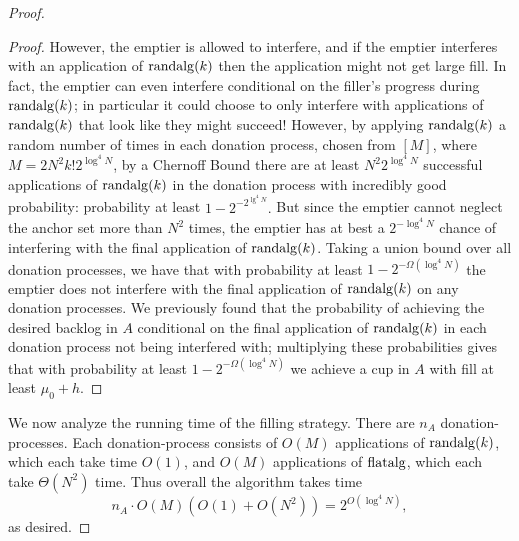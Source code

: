 \begin{proof}
\begin{proof}
  However, the emptier is allowed to interfere, and if the
  emptier interferes with an application of $\operatorname{\text{\textup{randalg}}}(k)$ then
  the application might not get large fill. In fact, the emptier
  can even interfere conditional on the filler's progress during
  $\operatorname{\text{\textup{randalg}}}(k)$; in particular it could choose to only interfere
  with applications of $\operatorname{\text{\textup{randalg}}}(k)$ that look like they might
  succeed! However, by applying $\operatorname{\text{\textup{randalg}}}(k)$ a random
  number of times in each donation process, chosen from $[M]$,
  where $M = 2N^2 k! 2^{\log^4 N}$, by a Chernoff Bound there are
  at least $N^2 2^{\log^4 N}$ successful applications of
  $\operatorname{\text{\textup{randalg}}}(k)$ in the donation process with incredibly good
  probability: probability at least $1-2^{-2^{\lg^4 N}}.$
  But since the emptier cannot neglect the anchor set more than
  $N^2$ times, the emptier has at best a $2^{-\log^4 N}$ chance
  of interfering with the final application of $\operatorname{\text{\textup{randalg}}}(k)$. 
  Taking a union bound over all donation processes, we have that
  with probability at least $1-2^{-\Omega(\log^4 N)}$ the emptier
  does not interfere with the final application of $\operatorname{\text{\textup{randalg}}}(k)$
  on any donation processes. We previously found that the
  probability of achieving the desired backlog in $A$ conditional
  on the final application of $\operatorname{\text{\textup{randalg}}}(k)$ in each donation
  process not being interfered with; multiplying these
  probabilities gives that with probability at least
  $1-2^{-\Omega(\log^4 N)}$ we achieve a cup in $A$ with fill
  at least $\mu_0 + h$.

\end{proof}

We now analyze the running time of the filling strategy. There
are $n_A$ donation-processes. Each donation-process consists of
$O(M)$ applications of $\operatorname{\text{\textup{randalg}}}(k)$, which each take time
$O(1)$, and $O(M)$ applications of $\operatorname{\text{\textup{flatalg}}}$, which each take
$\Theta(N^2)$ time. Thus overall the algorithm takes time $$n_A
\cdot O(M) (O(1) + O(N^2)) = 2^{O(\log^4 N)},$$ as desired.
  
\end{proof}

